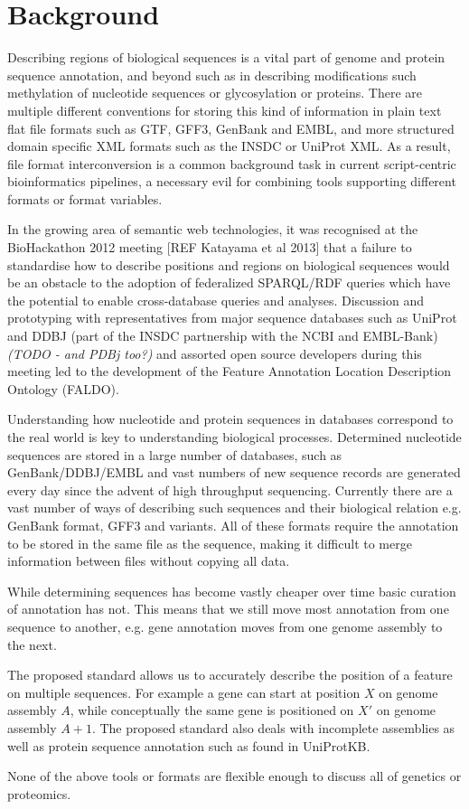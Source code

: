 \section*{Background}
Describing regions of biological sequences is a vital part of genome and protein sequence
annotation, and beyond such as in describing modifications such methylation of nucleotide
sequences or glycosylation or proteins.
There are multiple different conventions for storing this kind of information in
plain text flat file formats such as GTF, GFF3, GenBank and EMBL,
and more structured domain specific XML formats such as the INSDC or UniProt XML.
As a result, file format interconversion is a common background task in current script-centric
bioinformatics pipelines, a necessary evil for combining tools supporting different formats or
format variables.

In the growing area of semantic web technologies, it was recognised at the BioHackathon 2012
meeting [REF Katayama et al 2013] that a failure to standardise how to describe positions
and regions on biological sequences would be an obstacle to the adoption of federalized
SPARQL/RDF queries which have the potential to enable cross-database queries and
analyses. Discussion and prototyping with representatives from major sequence databases
such as UniProt and DDBJ (part of the INSDC partnership with the NCBI and EMBL-Bank)
\textit{(TODO - and PDBj too?)} and assorted open source developers during this meeting
led to the development of the Feature Annotation Location Description Ontology (FALDO).

Understanding how nucleotide and protein sequences in databases correspond to the real world is key to understanding biological processes.
Determined nucleotide sequences are stored in a large number of databases,
such as GenBank/DDBJ/EMBL and vast numbers of new sequence records are generated every day since the advent of high throughput sequencing.
Currently there are a vast number of ways of describing such sequences and their biological relation e.g. GenBank format, GFF3 and variants.
All of these formats require the annotation to be stored in the same file as the sequence,
making it difficult to merge information between files without copying all data.

While determining sequences has become vastly cheaper over time basic curation of annotation has not.
This means that we still move most annotation from one sequence to another,
e.g. gene annotation moves from one genome assembly to the next.

The proposed standard allows us to accurately describe the position of a feature on multiple sequences.
For example a gene can start at position $X$ on genome assembly $A$,
while conceptually the same gene is positioned on $X'$ on genome assembly $A+1$.
The proposed standard also deals with incomplete assemblies as well as protein sequence annotation such as found in UniProtKB.

None of the above tools or formats are flexible enough to discuss all of genetics or proteomics. 

